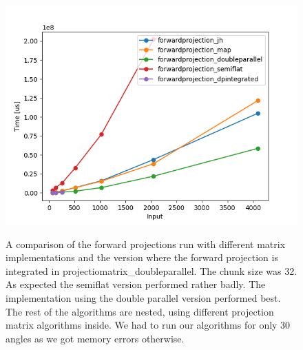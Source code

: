 \begin{figure}[h]
\includegraphics{images/forwardprojection_32.png}
\label{fpcompare}
  \caption{A comparison of the forward projections run with different matrix implementations and the version where the forward projection is integrated in projectiomatrix\_doubleparallel. The chunk size was 32. As expected the semiflat version performed rather badly. The implementation using the double parallel version performed best. The rest of the algorithms are nested, using different projection matrix algorithms inside. We had to run our algorithms for only 30 angles as we got memory errors otherwise.}
\end{figure}
